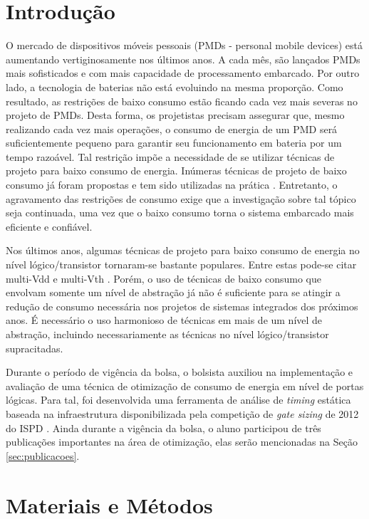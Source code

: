 \documentclass[
	12pt,				%
	openright,			%
	twoside,			%
	a4paper,			%
	english,			%
	french,				%
	spanish,			%
	brazil,				%
	]{abntex2}
\begin{document}
\section{Introdução}
O mercado de dispositivos móveis pessoais (PMDs - personal mobile devices) está aumentando vertiginosamente nos últimos anos. A cada mês, são lançados PMDs mais sofisticados e com mais capacidade de processamento embarcado. Por outro lado, a tecnologia de baterias não está evoluindo na mesma proporção. Como resultado, as restrições de baixo consumo estão ficando cada vez mais severas no projeto de PMDs. Desta forma, os projetistas precisam assegurar que, mesmo realizando cada vez mais operações, o consumo de energia de um PMD será suficientemente pequeno para garantir seu funcionamento em bateria por um tempo razoável. Tal restrição impõe a necessidade de se utilizar técnicas de projeto para baixo consumo de energia. Inúmeras técnicas de projeto de baixo consumo já foram propostas e tem sido utilizadas na prática \cite{keating2007low}. Entretanto, o agravamento das restrições de consumo exige que a investigação sobre tal tópico seja continuada, uma vez que o baixo consumo torna o sistema embarcado mais eficiente e confiável.

Nos últimos anos, algumas técnicas de projeto para baixo consumo de energia no nível lógico/transistor tornaram-se bastante populares. Entre estas pode-se citar multi-Vdd e multi-Vth \cite{medardoni2007power}. Porém, o uso de técnicas de baixo consumo que envolvam somente um nível de abstração já não é suficiente para se atingir a redução de consumo necessária nos projetos de sistemas integrados dos próximos anos. É necessário o uso harmonioso de técnicas em mais de um nível de abstração, incluindo necessariamente as técnicas no nível lógico/transistor supracitadas.

Durante o período de vigência da bolsa, o bolsista auxiliou na implementação e avaliação de uma técnica de otimização de consumo de energia em nível de portas lógicas. Para tal, foi desenvolvida uma ferramenta de análise de \textit{timing} estática baseada na infraestrutura disponibilizada pela competição de \textit{gate sizing} de 2012 do ISPD \cite{ozdal2012ispd}. Ainda durante a vigência da bolsa, o aluno participou de três publicações importantes na área de otimização, elas serão mencionadas na Seção \ref{sec:publicacoes}.

\section{Materiais e Métodos}
\end{document}
